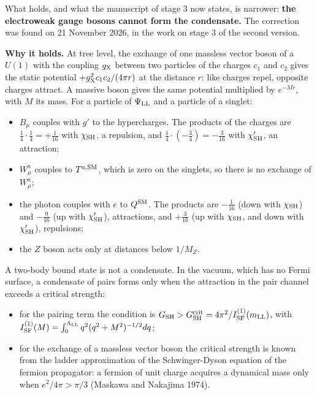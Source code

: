 \documentclass[
  10pt,
]{article}
\providecommand{\tightlist}{%
  \setlength{\itemsep}{0pt}\setlength{\parskip}{0pt}}
\begin{document}
What holds, and what the manuscript of stage 3 now states, is narrower:
\textbf{the electroweak gauge bosons cannot form the condensate.} The
correction was found on 21 November 2026, in the work on stage 3 of the
second version.

\textbf{Why it holds.} At tree level, the exchange of one massless
vector boson of a \(U(1)\) with the coupling \(g_{\rm X}\) between two
particles of the charges \(c_1\) and \(c_2\) gives the static potential
\(+g_{\rm X}^2c_1c_2/(4\pi r)\) at the distance \(r\): like charges
repel, opposite charges attract. A massive boson gives the same
potential multiplied by \(e^{-Mr}\), with \(M\) its mass. For a particle
of \(\Psi_{\rm LL}\) and a particle of a singlet:

\begin{itemize}
\tightlist
\item
  \(B_\mu\) couples with \(g'\) to the hypercharges. The products of the
  charges are \(\tfrac14\cdot\tfrac14=+\tfrac1{16}\) with
  \(\chi_{\rm SH}\), a repulsion, and
  \(\tfrac14\cdot(-\tfrac34)=-\tfrac3{16}\) with \(\chi'_{\rm SH}\), an
  attraction;
\item
  \(W^a_\mu\) couples to \(T^{a,{\rm SM}}\), which is zero on the
  singlets, so there is no exchange of \(W^a_\mu\);
\item
  the photon couples with \(e\) to \(Q^{\rm SM}\). The products are
  \(-\tfrac1{16}\) (down with \(\chi_{\rm SH}\)) and \(-\tfrac9{16}\)
  (up with \(\chi'_{\rm SH}\)), attractions, and \(+\tfrac3{16}\) (up
  with \(\chi_{\rm SH}\), and down with \(\chi'_{\rm SH}\)), repulsions;
\item
  the \(Z\) boson acts only at distances below \(1/M_Z\).
\end{itemize}

A two-body bound state is not a condensate. In the vacuum, which has no
Fermi surface, a condensate of pairs forms only when the attraction in
the pair channel exceeds a critical strength:

\begin{itemize}
\tightlist
\item
  for the pairing term the condition is
  \(G_{\rm SH}>G^{\rm crit}_{\rm SH}=4\pi^2/I^{(1)}_{\rm SF}(m_{\rm LL})\),
  with
  \(I^{(1)}_{\rm SF}(M)=\int_0^{\Lambda_{\rm LL}}q^2(q^2+M^2)^{-1/2}dq\);
\item
  for the exchange of a massless vector boson the critical strength is
  known from the ladder approximation of the Schwinger-Dyson equation of
  the fermion propagator: a fermion of unit charge acquires a dynamical
  mass only when \(e^2/4\pi>\pi/3\) (Maskawa and Nakajima 1974).
\end{itemize}
\end{document}
